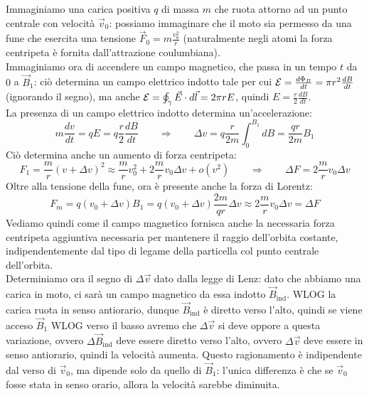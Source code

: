 \documentclass[]{article}
\begin{document}
Immaginiamo una carica positiva $ q $ di massa $ m $ che ruota attorno ad un punto centrale con velocità $ \vec{v}_0 $: possiamo immaginare che il moto sia permesso da una fune che esercita una tensione $ \vec{F}_0 = m \frac{v_0^2}{r} $ (naturalmente negli atomi la forza centripeta è fornita dall'attrazione coulumbiana). \\ 
%
Immaginiamo ora di accendere un campo magnetico, che passa in un tempo $ t $ da $ 0 $ a $ \vec{B}_1 $: ciò determina un campo elettrico indotto tale per cui $ \mathcal{E} = \frac{d\Phi_B}{dt} = \pi r^2 \frac{dB}{dt} $ (ignorando il segno), ma anche $ \mathcal{E} = \oint_{\gamma} \vec{E} \cdot d\vec{l} = 2\pi r E $, quindi $ E = \frac{r}{2}\frac{dB}{dt} $. \\ 
%
La presenza di un campo elettrico indotto determina un'accelerazione:
\begin{equation}
	m \frac{dv}{dt} = qE = q \frac{r}{2} \frac{dB}{dt} \qquad\Longrightarrow\qquad \Delta v = q \frac{r}{2m} \int_0^{B_1} dB = \frac{qr}{2m} B_1
	\label{eq:3}
\end{equation}
Ciò determina anche un aumento di forza centripeta:
\begin{equation}
	F_1 = \frac{m}{r} (v + \Delta v)^2 \approx \frac{m}{r} v_0^2 + 2 \frac{m}{r} v_0 \Delta v + o(v^2) \qquad\Longrightarrow\qquad \Delta F = 2 \frac{m}{r} v_0 \Delta v
	\label{eq:4}
\end{equation}
Oltre alla tensione della fune, ora è presente anche la forza di Lorentz:
\begin{equation}
	F_m = q (v_0 + \Delta v) B_1 = q (v_0 + \Delta v) \frac{2m}{qr} \Delta v \approx 2 \frac{m}{r} v_0 \Delta v = \Delta F
	\label{eq:5}
\end{equation}
Vediamo quindi come il campo magnetico fornisca anche la necessaria forza centripeta aggiuntiva necessaria per mantenere il raggio dell'orbita costante, indipendentemente dal tipo di legame della particella col punto centrale dell'orbita. \\ 
%
Determiniamo ora il segno di $ \Delta\vec{v} $ dato dalla legge di Lenz: dato che abbiamo una carica in moto, ci sarà un campo magnetico da essa indotto $ \vec{B}_{\text{ind}} $. WLOG la carica ruota in senso antiorario, dunque $ \vec{B}_{\text{ind}} $ è diretto verso l'alto, quindi se viene acceso $ \vec{B}_1 $ WLOG verso il basso avremo che $ \Delta\vec{v} $ si deve oppore a questa variazione, ovvero $ \Delta\vec{B}_{\text{ind}} $ deve essere diretto verso l'alto, ovvero $ \Delta\vec{v} $ deve essere in senso antiorario, quindi la velocità aumenta. Questo ragionamento è indipendente dal verso di $ \vec{v}_0 $, ma dipende solo da quello di $ \vec{B}_1 $: l'unica differenza è che se $ \vec{v}_0 $ fosse stata in senso orario, allora la velocità sarebbe diminuita.
\end{document}
